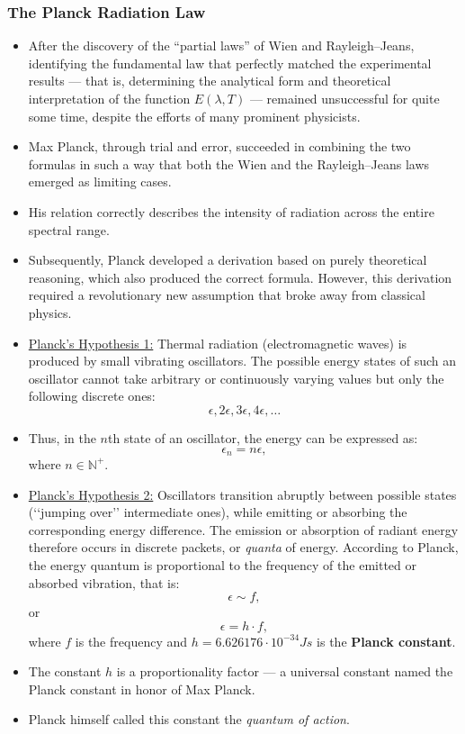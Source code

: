 \documentclass[t,aspectratio=169]{beamer}
\begin{document}
\begin{frame}
\frametitle{The Planck Radiation Law}
\begin{itemize}
\setlength{\parskip}{0pt}
\item After the discovery of the “partial laws” of Wien and Rayleigh–Jeans, identifying the fundamental law that perfectly matched the experimental results — that is, determining the analytical form and theoretical interpretation of the function $E\left(\lambda,T\right)$ — remained unsuccessful for quite some time, despite the efforts of many prominent physicists.
\item Max Planck, through trial and error, succeeded in combining the two formulas in such a way that both the Wien and the Rayleigh–Jeans laws emerged as limiting cases.
\item His relation correctly describes the intensity of radiation across the entire spectral range.
\item Subsequently, Planck developed a derivation based on purely theoretical reasoning, which also produced the correct formula. However, this derivation required a revolutionary new assumption that broke away from classical physics.
\item \underline{Planck’s Hypothesis 1:} Thermal radiation (electromagnetic waves) is produced by small vibrating oscillators. The possible energy states of such an oscillator cannot take arbitrary or continuously varying values but only the following discrete ones:
$$\epsilon, 2\epsilon, 3\epsilon, 4\epsilon, \dots$$
\item Thus, in the $n$th state of an oscillator, the energy can be expressed as:
$$\epsilon_{n}=n\epsilon,$$
where $n\in\mathbb{N}^{+}$.
\item \underline{Planck’s Hypothesis 2:} Oscillators transition abruptly between possible states (‘‘jumping over’’ intermediate ones), while emitting or absorbing the corresponding energy difference. The emission or absorption of radiant energy therefore occurs in discrete packets, or \textit{quanta} of energy. According to Planck, the energy quantum is proportional to the frequency of the emitted or absorbed vibration, that is:
$$\epsilon\sim f,$$
or
$$\epsilon=h\cdot f,$$
where $f$ is the frequency and $h = 6.626176\cdot 10^{-34} J s$ is the \textbf{Planck constant}.
\item The constant $h$ is a proportionality factor — a universal constant named the Planck constant in honor of Max Planck.
\pagebreak
\item Planck himself called this constant the \textit{quantum of action}.

\end{itemize}
\end{frame}
\end{document}
